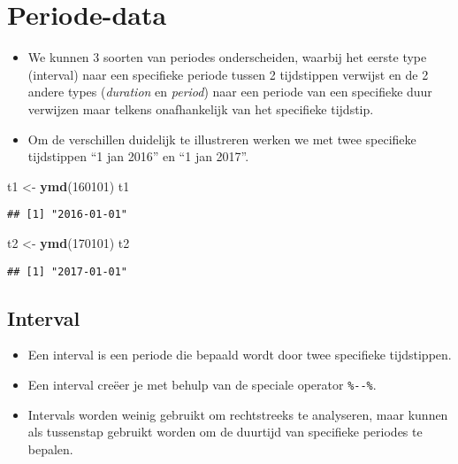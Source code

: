 \documentclass[]{memoir}
\newenvironment{Shaded}{\begin{snugshade}}{\end{snugshade}}
\newcommand{\KeywordTok}[1]{\textcolor[rgb]{0.13,0.29,0.53}{\textbf{#1}}}
\newcommand{\DecValTok}[1]{\textcolor[rgb]{0.00,0.00,0.81}{#1}}
\newcommand{\StringTok}[1]{\textcolor[rgb]{0.31,0.60,0.02}{#1}}
\newcommand{\NormalTok}[1]{#1}
\providecommand{\tightlist}{%
  \setlength{\itemsep}{0pt}\setlength{\parskip}{0pt}}
\begin{document}
\section{Periode-data}\label{periode-data}

\begin{itemize}
\tightlist
\item
  We kunnen 3 soorten van periodes onderscheiden, waarbij het eerste
  type (interval) naar een specifieke periode tussen 2 tijdstippen
  verwijst en de 2 andere types (\emph{duration} en \emph{period}) naar
  een periode van een specifieke duur verwijzen maar telkens
  onafhankelijk van het specifieke tijdstip.
\item
  Om de verschillen duidelijk te illustreren werken we met twee
  specifieke tijdstippen ``1 jan 2016'' en ``1 jan 2017''.
\end{itemize}

\begin{Shaded}
\begin{Highlighting}[]
\NormalTok{t1 <-}\StringTok{ }\KeywordTok{ymd}\NormalTok{(}\DecValTok{160101}\NormalTok{)}
\NormalTok{t1}
\end{Highlighting}
\end{Shaded}

\begin{verbatim}
## [1] "2016-01-01"
\end{verbatim}

\begin{Shaded}
\begin{Highlighting}[]
\NormalTok{t2 <-}\StringTok{ }\KeywordTok{ymd}\NormalTok{(}\DecValTok{170101}\NormalTok{)}
\NormalTok{t2}
\end{Highlighting}
\end{Shaded}

\begin{verbatim}
## [1] "2017-01-01"
\end{verbatim}

\subsection{Interval}\label{interval-1}

\begin{itemize}
\tightlist
\item
  Een interval is een periode die bepaald wordt door twee specifieke
  tijdstippen.
\item
  Een interval creëer je met behulp van de speciale operator
  \texttt{\%-\/-\%}.
\item
  Intervals worden weinig gebruikt om rechtstreeks te analyseren, maar
  kunnen als tussenstap gebruikt worden om de duurtijd van specifieke
  periodes te bepalen.
\end{itemize}
\end{document}
